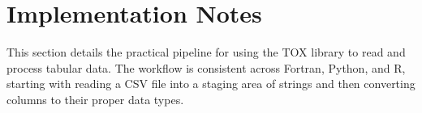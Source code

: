 \documentclass[11pt]{article}
\begin{document}


\tableofcontents
\newpage




\section{Implementation Notes}

This section details the practical pipeline for using the TOX library to read and
process tabular data. The workflow is consistent across Fortran, Python, and R,
starting with reading a CSV file into a staging area of strings and then converting
columns to their proper data types.




\end{document}
